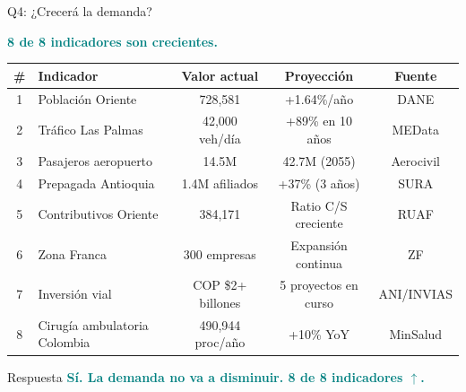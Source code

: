 \documentclass[aspectratio=169, 11pt]{beamer}
\newcommand{\highlight}[1]{\textcolor{teal}{\textbf{#1}}}
\begin{document}
\begin{frame}{Q4: ¿Crecerá la demanda?}
\begin{center}
\Large\highlight{8 de 8 indicadores son crecientes.}
\end{center}

\vspace{4pt}
{\scriptsize\setlength{\tabcolsep}{4pt}
\begin{tabular}{@{}clccc@{}}
\toprule
\textbf{\#} & \textbf{Indicador} & \textbf{Valor actual} & \textbf{Proyección} & \textbf{Fuente} \\
\midrule
1 & Población Oriente & 728,581 & +1.64\%/año & DANE \\
\rowcolor{teal!6}
2 & Tráfico Las Palmas & 42,000 veh/día & +89\% en 10 años & MEData \\
3 & Pasajeros aeropuerto & 14.5M & 42.7M (2055) & Aerocivil \\
\rowcolor{teal!6}
4 & Prepagada Antioquia & 1.4M afiliados & +37\% (3 años) & SURA \\
5 & Contributivos Oriente & 384,171 & Ratio C/S creciente & RUAF \\
\rowcolor{teal!6}
6 & Zona Franca & 300 empresas & Expansión continua & ZF \\
7 & Inversión vial & COP \$2+ billones & 5 proyectos en curso & ANI/INVIAS \\
\rowcolor{teal!6}
8 & Cirugía ambulatoria Colombia & 490,944 proc/año & +10\% YoY & MinSalud \\
\bottomrule
\end{tabular}
}

\vspace{6pt}
\begin{exampleblock}{\small Respuesta}
\centering\large
\highlight{Sí. La demanda no va a disminuir. 8 de 8 indicadores $\uparrow$.}
\end{exampleblock}
\end{frame}
\end{document}
